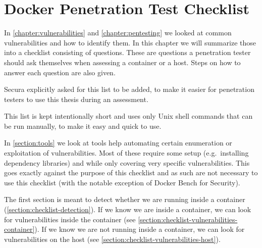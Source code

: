 \chapter{Docker Penetration Test Checklist}\label{chapter:checklist}
In \autoref{chapter:vulnerabilities} and \autoref{chapter:pentesting} we looked at common vulnerabilities and how to identify them. In this chapter we will summarize those into a checklist consisting of questions. These are questions a penetration tester should ask themselves when assessing a container or a host. Steps on how to answer each question are also given.

Secura explicitly asked for this list to be added, to make it easier for penetration testers to use this thesis during an assessment.

\medskip

This list is kept intentionally short and uses only Unix shell commands that can be run manually, to make it easy and quick to use.

In \autoref{section:tools} we look at tools help automating certain enumeration or exploitation of vulnerabilities. Most of these require some setup (e.g.\ installing dependency libraries) and while only covering very specific vulnerabilities. This goes exactly against the purpose of this checklist and as such are not necessary to use this checklist (with the notable exception of Docker Bench for Security).

\medskip

The first section is meant to detect whether we are running inside a container (\autoref{section:checklist-detection}). If we know we are inside a container, we can look for vulnerabilities inside the container (see \autoref{section:checklist-vulnerabilities-container}). If we know we are not running inside a container, we can look for vulnerabilities on the host (see \autoref{section:checklist-vulnerabilities-host}).




